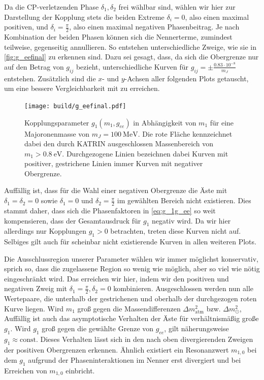 Da die CP-verletzenden Phase $\delta_1,\delta_2$ frei wählbar sind, wählen wir hier zur Darstellung der Kopplung stets die beiden Extreme $\delta_i = 0$, also einen maximal positiven, und $\delta_i = \frac{\pi}{2}$, also einen maximal negativen Phasenbeitrag.
Je nach Kombination der beiden Phasen können sich die Nennerterme, zumindest teilweise, gegenseitig annullieren.
So entstehen unterschiedliche Zweige, wie sie in \autoref{fig:g_eefinal} zu erkennen sind.
Dazu sei gesagt, dass, da sich die Obergrenze nur auf den Betrag von $g_{i j}$ bezieht, unterschiedliche Kurven für $g_{ij} = \pm \frac{\num{0.83} \cdot 10^{-8}}{m_J}$ entstehen.
Zusätzlich sind die $x$- und $y$-Achsen aller folgenden Plots getauscht, um eine bessere Vergleichbarkeit mit \cite{päspaper} zu erreichen.
\begin{figure}[H]
    \centering
    \texttt{[image: build/g\_eefinal.pdf]}
    \caption{Kopplungsparameter $g_1(m_1,g_{ee})$ in Abhängigkeit von $m_1$ für eine Majoronenmasse von $m_J = \SI{100}{\mega\eV}$. Die rote Fläche kennzeichnet dabei den durch KATRIN ausgeschlossen Massenbereich von $m_1 > \SI{0.8}{\eV}$.
    Durchgezogene Linien bezeichnen dabei Kurven mit positiver, gestrichene Linien immer Kurven mit negativer Obergrenze.}
    \label{fig:g_eefinal}
\end{figure}
Auffällig ist, dass für die Wahl einer negativen Obergrenze die Äste mit $\delta_1 = \delta_2 = 0$ sowie $\delta_1 = 0$ und $\delta_2 = \frac{\pi}{2}$ im gewählten Bereich nicht existieren.
Dies stammt daher, dass sich die Phasenfaktoren in \eqref{eq:g_1g_ee} so weit kompensieren, dass der Gesamtausdruck für $g_1$ negativ wird.
Da wir hier allerdings nur Kopplungen $g_1 > 0$ betrachten, treten diese Kurven nicht auf.
Selbiges gilt auch für scheinbar nicht existierende Kurven in allen weiteren Plots.

Die Ausschlussregion unserer Parameter wählen wir immer möglichst konservativ, sprich so, dass die zugelassene Region so wenig wie möglich, aber so viel wie nötig eingeschränkt wird.
Das erreichen wir hier, indem wir den positiven und negativen Zweig mit $\delta_1 = \frac{\pi}{2}, \delta_2 = 0$ kombinieren.
Ausgeschlossen werden nun alle Wertepaare, die unterhalb der gestrichenen und oberhalb der durchgezogen roten Kurve liegen.
Wird $m_1$ groß gegen die Massendifferenzen $\Delta m^2_\text{atm}$ bzw. $\Delta m^2_\odot$,   
Auffällig ist auch das asymptotische Verhalten der Äste für verhältnismäßig große $g_1$.
Wird $g_1$ groß gegen die gewählte Grenze von $g_{ee}$, gilt näherungsweise $g_1 \approx \text{const}$.
Dieses Verhalten lässt sich in den nach oben divergierenden Zweigen der positiven Obergrenzen erkennen.
Ähnlich existiert ein Resonanzwert $m_{1,0}$ bei dem $g_1$ aufgrund der Phaseninteraktionen im Nenner erst divergiert und bei Erreichen von $m_{1,0}$ einbricht.

